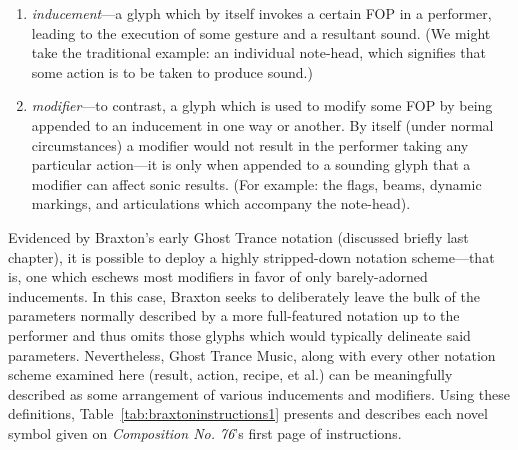             \begin{smallquote}
                \begin{enumerate}
                    \item \textit{inducement}---a glyph which by itself invokes a certain FOP in a performer, leading to the execution of some gesture and a resultant sound. (We might take the traditional example: an individual note-head, which signifies that some action is to be taken to produce sound.)
                    \item \textit{modifier}---to contrast, a glyph which is used to modify some FOP by being appended to an inducement in one way or another. By itself (under normal circumstances) a modifier would not result in the performer taking any particular action---it is only when appended to a sounding glyph that a modifier can affect sonic results. (For example: the flags, beams, dynamic markings, and articulations which accompany the note-head).
                \end{enumerate}
            \end{smallquote}
       
        Evidenced by Braxton's early Ghost Trance notation (discussed briefly last chapter), it is possible to deploy a highly stripped-down notation scheme---that is, one which eschews most modifiers in favor of only barely-adorned inducements. In this case, Braxton seeks to deliberately leave the bulk of the parameters normally described by a more full-featured notation up to the performer and thus omits those glyphs which would typically delineate said parameters. Nevertheless, Ghost Trance Music, along with every other notation scheme examined here (result, action, recipe, et al.) can be meaningfully described as some arrangement of various inducements and modifiers. Using these definitions, Table~\ref{tab:braxtoninstructions1} presents and describes each novel symbol given on \textit{Composition No. 76}'s first page of instructions. 
        

